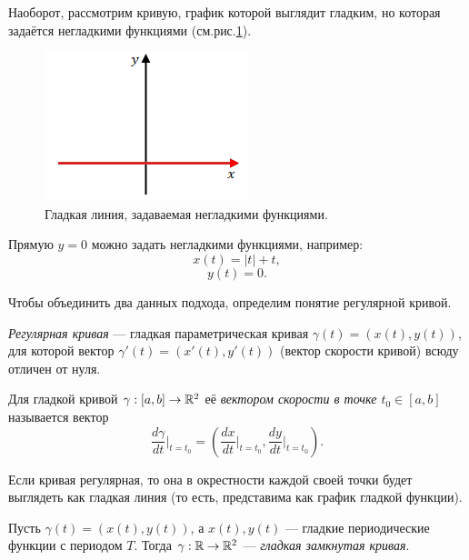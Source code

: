 \begin{example}
    Наоборот, рассмотрим кривую, график которой выглядит гладким, но которая задаётся негладкими функциями (см.рис.\ref{fig:c12.3}).
    \begin{figure}[H]
        \centering
        \includegraphics[scale=0.7]{images/c12.3.png}
        \caption{Гладкая линия, задаваемая негладкими функциями.}
        \label{fig:c12.3}
    \end{figure}
    Прямую $y = 0$ можно задать негладкими функциями, например:
    \[x(t) = |t| + t,\]
    \[y(t) = 0.\]
\end{example}

Чтобы объединить два данных подхода, определим понятие регулярной кривой.

\begin{definition}
    \textit{Регулярная кривая} — гладкая параметрическая кривая $\gamma(t) = (x(t), y(t))$, для которой вектор $\gamma'(t) = (x'(t), y'(t))$ (вектор скорости кривой) всюду отличен от нуля.
\end{definition}

\begin{definition}
    Для гладкой кривой $\gamma: [a,b] \to \mathbb{R}^2$ её \textit{вектором скорости в точке $t_0 \in [a,b]$} называется вектор 
    \[\frac{d\gamma}{dt}\Big|_{t=t_0} = \left(\frac{dx}{dt}\Big|_{t=t_0}, \frac{dy}{dt}\Big|_{t=t_0}\right).\]
\end{definition}

\begin{remark}
    Если кривая регулярная, то она в окрестности каждой своей точки будет выглядеть как гладкая линия (то есть, представима как график гладкой функции).
\end{remark}

\begin{definition}
    Пусть $\gamma(t) = (x(t), y(t))$, а $x(t), y(t)$ — гладкие периодические функции с периодом $T$. Тогда $\gamma: \mathbb{R} \to \mathbb{R}^2$ — \textit{гладкая замкнутая кривая}.
\end{definition} 

